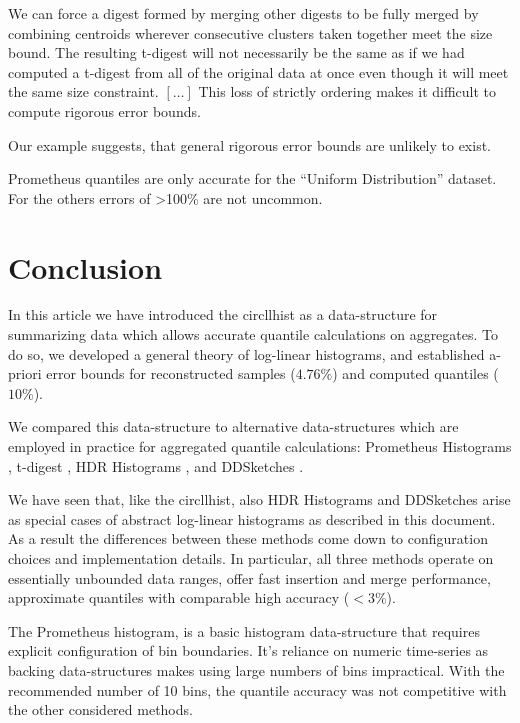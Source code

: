\documentclass{article}
\theoremstyle{plain}
\theoremstyle{remark}
\begin{document}
\begin{displayquote}
  We can force a digest formed by merging other digests to be fully merged by combining centroids
  wherever consecutive clusters taken together meet the size bound. The resulting t-digest will not
  necessarily be the same as if we had computed a t-digest from all of the original data at once
  even though it will meet the same size constraint. $[\dots]$ This loss of strictly ordering makes
  it difficult to compute rigorous error bounds.
\end{displayquote}

Our example suggests, that general rigorous error bounds are unlikely to exist.

Prometheus quantiles are only accurate for the ``Uniform Distribution'' dataset.
For the others errors of >100\% are not uncommon.

\section{Conclusion}

In this article we have introduced the circllhist as a data-structure for summarizing data which
allows accurate quantile calculations on aggregates.  To do so, we developed a general theory of
log-linear histograms, and established a-priori error bounds for reconstructed samples ($4.76\%$)
and computed quantiles ($10\%$).

We compared this data-structure to alternative data-structures which are employed in practice for
aggregated quantile calculations: Prometheus Histograms \cite{prom}, t-digest \cite{tdigest}, HDR
Histograms \cite{hdr}, and DDSketches \cite{dd}.

We have seen that, like the circllhist, also HDR Histograms and DDSketches arise as special cases of
abstract log-linear histograms as described in this document. As a result the differences between
these methods come down to configuration choices and implementation details.  In particular, all
three methods operate on essentially unbounded data ranges, offer fast insertion and merge
performance, approximate quantiles with comparable high accuracy ($<3\%$).

The Prometheus histogram, is a basic histogram data-structure that requires explicit configuration
of bin boundaries. It's reliance on numeric time-series as backing data-structures makes using large
numbers of bins impractical. With the recommended number of 10 bins, the quantile accuracy was not
competitive with the other considered methods.
\end{document}
